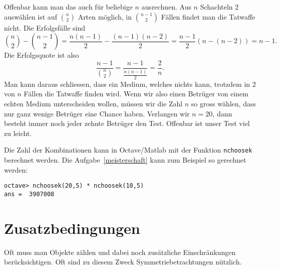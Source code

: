 \begin{beispiele}
\begin{loesung}
Offenbar kann man das auch für beliebige $n$ ausrechnen.
Aus $n$
Schachteln $2$ auswählen ist auf $\binom{n}2$ Arten möglich, in
$\binom{n-1}2$ Fällen findet man die Tatwaffe nicht.
Die Erfolgsfälle
sind
\[
\binom{n}2-\binom{n-1}2
=
\frac{n(n-1)}2-\frac{(n-1)(n-2)}2
=
\frac{n-1}2(n-(n-2))=n-1.
\]
Die Erfolgsquote ist also
\[
\frac{n-1}{\displaystyle\binom{n}2}
=
\frac{n-1}{\displaystyle\frac{n(n-1)}2}=\frac2n.
\]
Man kann daraus schliessen, dass ein Medium, welches nichts kann,
trotzdem in $2$ von $n$ Fällen die Tatwaffe finden wird.
Wenn wir also einen Betrüger von einem echten Medium unterscheiden
wollen, müssen wir die Zahl $n$ so gross wählen, dass nur ganz
wenige Betrüger eine Chance haben.
Verlangen wir $n=20$, dann
besteht immer noch jeder zehnte Betrüger den Test.
Offenbar ist unser
Test viel zu leicht.
\end{loesung}

\end{beispiele}
Die Zahl der Kombinationen kann in Octave/Matlab mit der Funktion
{\tt nchoosek} berechnet werden.
Die Aufgabe~\ref{meisterschaft}
kann zum Beispiel so gerechnet werden:
\begin{verbatim}
octave> nchoosek(20,5) * nchoosek(10,5)
ans =  3907008
\end{verbatim}

\section{Zusatzbedingungen}
Oft muss man Objekte zählen und dabei noch zusätzliche Einschränkungen
berücksichtigen.
Oft sind zu diesem Zweck Symmetriebetrachtungen
nützlich.

